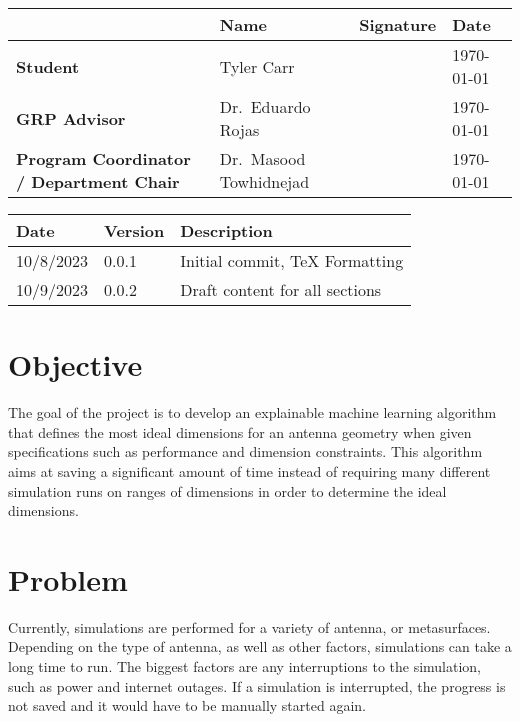 \documentclass[12pt, letterpaper, notitlepage]{article}
\begin{document}
\newpage

\begin{center}
\bgroup
\footnotesize
\def\arraystretch{1.5}
\centering
\noindent\begin{tabular}{|p{12em}|l|p{12em}|l|} \hline
    \rowcolor{lightgray}& \textbf{Name} & \textbf{Signature} & \textbf{Date} \\ \hline
    \textbf{Student} & Tyler Carr & & \today \\ \hline
    \textbf{GRP Advisor} & Dr.\ Eduardo Rojas & & \today \\ \hline
    \textbf{Program Coordinator / Department Chair} & Dr.\ Masood Towhidnejad & & \today \\ \hline
\end{tabular}
\egroup
\end{center}

\newpage

\begin{center}
\centering
\noindent\begin{tabular}{|l|l|l|} \hline
    \rowcolor{lightgray}\textbf{Date} & \textbf{Version} & \textbf{Description} \\ \hline
    10/8/2023 & 0.0.1 & Initial commit, TeX Formatting\\ \hline
    10/9/2023 & 0.0.2 & Draft content for all sections\\ \hline
\end{tabular}
\vspace*{1em}
\end{center}


\section*{Objective}
The goal of the project is to develop an explainable machine learning algorithm that defines the most ideal dimensions for an antenna geometry when given specifications such as performance and dimension constraints. This algorithm aims at saving a significant amount of time instead of requiring many different simulation runs on ranges of dimensions in order to determine the ideal dimensions.\\


\section*{Problem}
Currently, simulations are performed for a variety of antenna, or metasurfaces. Depending on the type of antenna, as well as other factors, simulations can take a long time to run. The biggest factors are any interruptions to the simulation, such as power and internet outages. If a simulation is interrupted, the progress is not saved and it would have to be manually started again.
\end{document}
